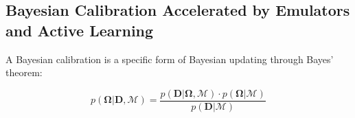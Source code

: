 \documentclass[draft,linenumbers,onecolumn]{agujournal2019} %
\begin{document}
%
%
%
%
%



\subsection{Bayesian Calibration Accelerated by Emulators and Active Learning}
\label{sec:bayesCal}

A Bayesian calibration is a specific form of Bayesian updating through Bayes' theorem:

\begin{equation}
	p\left( \mathbf{\Omega} \vert \mathbf{D},\mathcal{M} \right) = \frac{p\left( \mathbf{D} \vert \mathbf{\Omega},\mathcal{M} \right) \cdot p\left( \mathbf{\Omega}\vert \mathcal{M}\right) }{p\left( \mathbf{D}\vert\mathcal{M}\right) }
	\label{eq:Bayes}
\end{equation}
\end{document}
